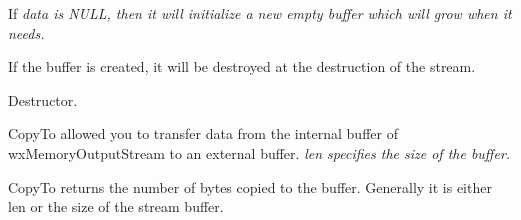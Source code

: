 
If \it{data} is NULL, then it will initialize a new empty buffer which will
grow when it needs.


If the buffer is created, it will be destroyed at the destruction of the
stream.



Destructor.



CopyTo allowed you to transfer data from the internal buffer of
wxMemoryOutputStream to an external buffer. \it{len} specifies the size of
the buffer.


CopyTo returns the number of bytes copied to the buffer. Generally it is either
len or the size of the stream buffer.

